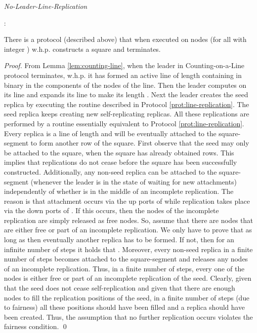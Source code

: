 \documentclass[oribibl, 11pt]{llncs}
\begin{document}
\renewcommand{\algorithmiccomment}[1]{// #1}
\begin{algorithm}[!h]
  \caption{\emph{No-Leader-Line-Replication}}\label{prot:no-leader-lr}
  \begin{algorithmic}
    \medskip
    \State 
    \State : 
    
\end{algorithmic}
\end{algorithm}

\begin{lemma} \label{lem:square}
There is a protocol (described above) that when executed on  nodes (for all  with integer ) w.h.p. constructs a  square and terminates.
\end{lemma}
\begin{proof}
From Lemma \ref{lem:counting-line}, when the leader in Counting-on-a-Line protocol terminates, w.h.p. it has formed an active line of length  containing  in binary in the  components of the nodes of the line. Then the leader computes  on its line and expands its line to make its length . Next the leader creates the seed replica by executing the routine described in Protocol \ref{prot:line-replication}. The seed replica keeps creating new self-replicating replicas. All these replications are performed by a routine essentially equivalent to Protocol \ref{prot:line-replication}. Every replica is a line of length  and will be eventually attached to the square-segment to form another row of the square. First observe that the seed may only be attached to the square, when the square has already obtained  rows. This implies that replications do not cease before the square has been successfully constructed. Additionally, any non-seed replica  can be attached to the square-segment (whenever the  leader is in the state of waiting for new attachments) independently of whether  is in the middle of an incomplete replication. The reason is that attachment occurs via the up ports of  while replication takes place via the down ports of . If this occurs, then the nodes of the incomplete replication are simply released as free nodes. So, assume that there are  nodes that are either free or part of an incomplete replication. We only have to prove that as long as  then eventually another replica has to be formed. If not, then for an infinite number of steps it holds that . Moreover, every non-seed replica in a finite number of steps becomes attached to the square-segment and releases any nodes of an incomplete replication. Thus, in a finite number of steps, every one of the  nodes is either free or part of an incomplete replication of the seed. Clearly, given that the seed does not cease self-replication and given that there are enough nodes to fill the  replication positions of the seed, in a finite number of steps (due to fairness) all these positions should have been filled and a replica should have been created. Thus, the assumption that no further replication occurs violates the fairness condition.
\qed
\end{proof}
\end{document}
